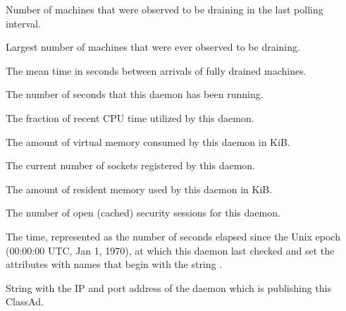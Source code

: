 \begin{description}
\item[\AdAttr{MachinesDraining}:] Number of machines that were observed
  to be draining in the last polling interval.

\item[\AdAttr{MachinesDrainingPeak}:] Largest number of machines that were
ever observed to be draining.

\item[\AdAttr{MeanDrainedArrived}:] The mean time in seconds 
between arrivals of fully drained machines.

\item[\AdAttr{MonitorSelfAge}:] The number of seconds that this daemon
  has been running.

\item[\AdAttr{MonitorSelfCPUUsage}:] The fraction of recent CPU time utilized
  by this daemon. 

\item[\AdAttr{MonitorSelfImageSize}:] The amount of virtual memory consumed by
  this daemon in KiB.

\item[\AdAttr{MonitorSelfRegisteredSocketCount}:] The current number of sockets
  registered by this daemon.

\item[\AdAttr{MonitorSelfResidentSetSize}:] The amount of resident memory
  used by this daemon in KiB.

\item[\AdAttr{MonitorSelfSecuritySessions}:] The number of open (cached)
  security sessions for this daemon.

\item[\AdAttr{MonitorSelfTime}:] The  time, represented as the number of
  seconds elapsed since the Unix epoch (00:00:00 UTC, Jan 1, 1970),
  at which this daemon last checked and set the attributes with names that
  begin with the string .
  
\item[\AdAttr{MyAddress}:] String with the IP and port address of the
 daemon which is publishing this ClassAd.


\end{description}
